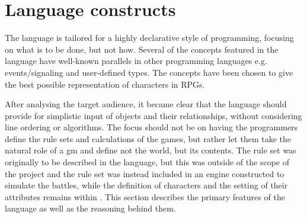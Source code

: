 \section{Language constructs}
The \langname{} language is tailored for a highly declarative style of programming, focusing on what is to be done, but not how. Several of the concepts featured in the language have well-known
parallels in other programming languages e.g. events/signaling and user-defined types. The concepts have been chosen to give the best possible representation of characters in RPGs.

After analysing the target audience, it became clear that the language should provide for
simplistic input of objects and their relationships, without considering line
ordering or algorithms. The focus should not be on having the programmers define the rule sets
and calculations of the games, but rather let them take the natural role of a \ac{gm}
and define not the world, but its contents. The rule set was originally to be described in the
language, but this was outside of the scope of the project and the rule set was instead included in an engine constructed to simulate the battles, while the definition of characters and the setting of their attributes remains within \langname{}. This section describes the primary features of the
\langname{} language as well as the reasoning behind them.
